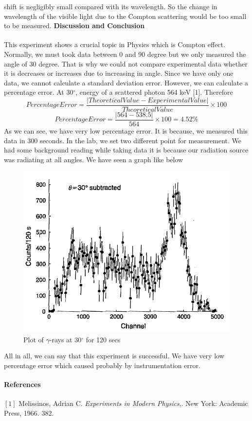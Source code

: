 \documentclass[a4paper,12pt]{article}
\begin{document}
shift is negligibly small compared with its wavelength. So the change in wavelength of
the visible light due to the Compton scattering would be too small to be measured.
\newpage
\textbf{Discussion and Conclusion}\\\\
This experiment shows a crucial topic in Physics which is Compton effect. Normally, we must took data between 0 and 90 degree but we only measured the angle of 30 degree. That is why we could not compare experimental data whether it is decreases or increases due to increasing in angle. Since we have only one data, we cannot calculate a standard deviation error. However, we can calculate a percentage error. At 30$^{\circ}$, energy of a scattered photon 564 keV [1]. Therefore
\begin{equation}
Percentage Error=\frac{|Theoretical Value-Experimental Value|}{Theoretical Value}\times 100
\end{equation} 
\begin{equation}
Percentage Error=\frac{|564-538.5|}{564}\times 100 = 4.52 \%
\end{equation}
As we can see, we have very low percentage error. It is because, we measured this data in 300 seconds. In the lab, we set two different point for measurement. We had some background reading while taking data it is because our radiation source was radiating at all angles. We have seen a graph like below
\begin{figure}[h!]
\centering
\includegraphics[scale=0.7]{Capture}
\caption{Plot of $\gamma$-rays at 30$^{\circ}$ for 120 secs}
\label{fig:Capture}
\end{figure}
All in all, we can say that this experiment is successful. We have very low percentage error which caused probably by instrumentation error.\\\\
\textbf{References}\\\\
$[1]$ Melissinos, Adrian C. \textit{Experiments in Modern Physics},. New York: Academic Press, 1966. 382.
\end{document}
